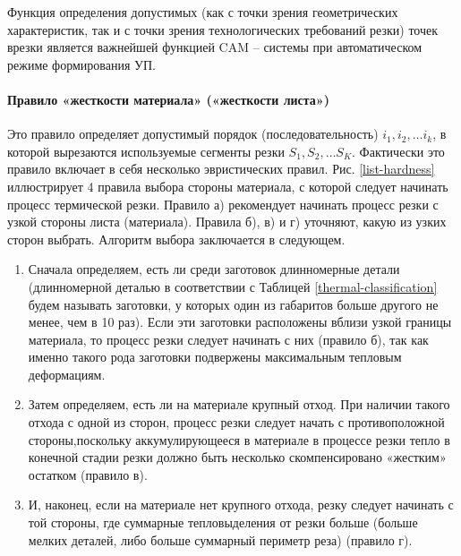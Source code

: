 \documentclass{article}
\begin{document}
Функция определения допустимых
(как с точки зрения геометрических характеристик,
так и с точки зрения технологических требований резки)
точек врезки является важнейшей функцией CAM – системы
при автоматическом режиме формирования УП.

\paragraph{Правило «жесткости материала» («жесткости листа»)}

Это правило определяет допустимый порядок
(последовательность)
$i_1, i_2, \dots i_k$,
в которой вырезаются используемые сегменты резки
$S_1, S_2, \dots S_K$.
Фактически это правило включает в себя несколько эвристических правил.
Рис. \ref{list-hardness}
иллюстрирует 4 правила выбора стороны материала,
с которой следует начинать процесс термической резки.
Правило а) рекомендует начинать процесс резки с узкой стороны листа (материала).
Правила б), в) и г) уточняют,
какую из узких сторон выбрать.
Алгоритм выбора заключается в следующем.

\begin{enumerate}
  \item
  Сначала определяем,
  есть ли среди заготовок длинномерные детали
  (длинномерной деталью в соответствии с Таблицей \ref{thermal-classification}
  будем называть заготовки, у которых один из габаритов больше другого не менее,
  чем в 10 раз).
  Если эти заготовки расположены вблизи
  узкой границы материала,
  то процесс резки следует начинать с них
  (правило б),
  так как именно такого рода заготовки
  подвержены максимальным тепловым деформациям.
  \item
  Затем определяем,
  есть ли на материале крупный отход.
  При наличии такого отхода с одной из сторон,
  процесс резки следует начать с противоположной стороны,поскольку аккумулирующееся в материале в процессе резки
  тепло в конечной стадии резки должно быть
  несколько скомпенсировано «жестким» остатком
  (правило в).
  \item
  И, наконец,
  если на материале нет крупного отхода,
  резку следует начинать с той стороны,
  где суммарные тепловыделения от резки больше
  (больше мелких деталей, либо больше суммарный периметр реза)
  (правило г).
\end{enumerate}
\end{document}
